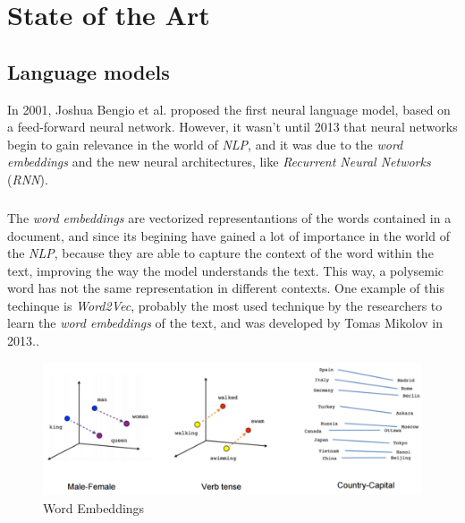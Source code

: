 
\chapter{State of the Art}
\label{ch:StateOfTheArt}
\noindent

\section{Language models}
\label{sec:LanguageModels}
\noindent In 2001, Joshua Bengio et al. proposed the first neural language model, based on a feed-forward neural network.\cite{Bengio2001} However, it wasn't until 2013 that neural networks begin to gain relevance in the world of \emph{NLP}, and it was due to the \emph{word embeddings} and the new neural architectures, like \emph{Recurrent Neural Networks} (\emph{RNN}).
\paragraph{}
The \emph{word embeddings} are vectorized representantions of the words contained in a document, and since its begining have gained a lot of importance in the world of the \emph{NLP}, because they are able to capture the context of the word within the text, improving the way the model understands the text. This way, a polysemic word has not the same representation in different contexts. One example of this techinque is \emph{Word2Vec}, probably the most used technique by the researchers to learn the \emph{word embeddings} of the text, and was developed by Tomas Mikolov in 2013.\cite{Mikolov2013}.
\begin{figure}[h!]
	\centering
	\includegraphics[scale=0.35]{images/wordembeddings}
	\caption{Word Embeddings}
	\label{fig:wordembdedding}
\end{figure}
